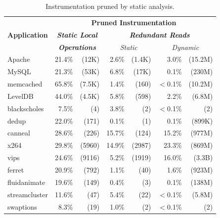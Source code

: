 \documentclass[preprint,9pt]{sigplanconf}
\begin{document}
\begin{table}
\renewcommand{\tabcolsep}{2pt}
\centering
\small
\begin{tabular}{l | r r | r r | r r}
\multirow{3}{*}{\bf Application} & \multicolumn{6}{c}{\bf Pruned Instrumentation} \\
               & \multicolumn{2}{c|}{\bf \em Static Local}          & \multicolumn{4}{c}{\bf \em  Redundant Reads}                 \\ 
               & \multicolumn{2}{c|}{\bf \em Operations}          & \multicolumn{2}{c|}{ \em  Static} & \multicolumn{2}{c}{ \em  Dynamic}                \\ \hline
Apache         &  21.4\%&(12K)                &  2.6\%& (1.4K)                        & 3.0\%   & (15.2M)                   \\
MySQL          &  21.3\%&(53K)                &  6.8\%& (17K)                         & 0.1\%   & (230M)                    \\
memcached      &  65.8\%&(7.5K)               & 1.4\% & (160)                        & $<$0.1\% & (10.2M)                   \\
LevelDB        &  44.0\%&(4.5K)               & 5.8\% & (598)                         & 2.2\%   & (6.8M)                    \\ \hline
blackscholes   &   7.5\%&(4)                  & 3.8\% & (2)                           & $<$0.1\%& (2)                       \\
dedup          &   22.0\%&(171)               & 0.1\% & (1)                           &  0.1\%  & (899K)                    \\
canneal        &   28.6\%&(226)               & 15.7\%& (124)                         &  15.2\% & (977M)                    \\
x264           &   29.8\%&(5960)              & 14.9\%& (2987)                        &  23.3\% & (869M)                    \\
vips           &   24.6\%&(9116)              & 5.2\% & (1919)                        &  16.0\% & (3.3B)                    \\
ferret         &   20.9\%&(792)               & 1.1\% & (40)                          &   1.6\% & (923M)                    \\
fluidanimate   &   19.6\%&(149)               & 0.4\% & (3)                           &   0.1\% & (138M)                    \\
streamcluster  &   11.6\%&(47)                & 5.4\% & (22)                          & $<$0.1\%& (5.8M)                    \\
swaptions      &   8.3\% &(19)                & 1.0\% & (2)                           & $<$0.1\%& (2)                       \\
\end{tabular}
\caption{\label{tab:char}Instrumentation pruned by static analysis.}
\end{table}
\end{document}
